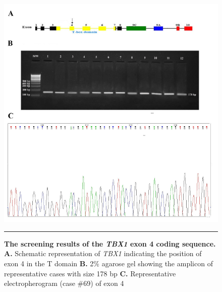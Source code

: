 \begin{refsection}
\begin{figure}[!thbp]
\centering
\includegraphics[width=\linewidth]{Figures/Figure4_4TBX4.pdf}
\rule{35em}{0.5pt}
\caption{\textbf{The screening results of the \textit{TBX1} exon 4 coding sequence.}
\textbf{A.} Schematic representation of \textit{TBX1} indicating the position of exon 4 in the T domain 
\textbf{B.} 2\% agarose gel showing the amplicon of representative cases with size 178 bp 
\textbf{C.} Representative electropherogram (case \#69) of exon 4}
\label{fig:4_4}
\end{figure}


\end{refsection}
